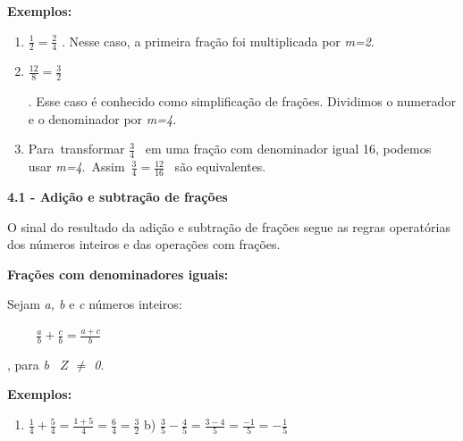 \documentclass[12pt]{article}
\renewcommand{\_}{\kern-1.5pt\textunderscore\kern-1.5pt}
\begin{document}
\textbf{Exemplos:}\par

\begin{enumerate}
	\item  \( \frac{1}{2}=\frac{2}{4} \)  . Nesse caso, a primeira fração foi multiplicada por \textit{m=2}.\par


\vspace{\baselineskip}
	\item   \( \frac{12}{8}=\frac{3}{2} \) {\fontsize{16pt}{19.2pt}\selectfont  . Esse caso é conhecido como simplificação de frações. Dividimos o numerador e o denominador por \textit{m=4.} \par}\par


\vspace{\baselineskip}
\setlength{\parskip}{8.04pt}
\setlength{\parskip}{0.0pt}
	\item Para\ transformar   \( \frac{3}{4} \) \  em uma fração com denominador igual 16, podemos usar \textit{m=4}.\ Assim\    \( \frac{3}{4}=\frac{12}{16} \) \  são equivalentes.
\end{enumerate}\par


\vspace{\baselineskip}
\textbf{4.1 - Adição e subtração de frações }\par

\tab O sinal do resultado da adição e subtração de frações segue as regras operatórias dos números inteiros e das operações com frações.\par

\tab 
\vspace{\baselineskip}\tab \textbf{Frações com denominadores iguais:}\par

Sejam \textit{a, b} e \textit{c} números inteiros: \par

\textbf{\tab \ \ \ \   \( \frac{a}{b}+\frac{c}{b}=\frac{a+c}{b} \) \tab }{\fontsize{16pt}{19.2pt}\selectfont \tab , para \textit{b \   \( Z \)  $ \neq $  0}.\par}\par

\textbf{Exemplos: }\par

\begin{enumerate}
	\item  \( \frac{1}{4}+\frac{5}{4}=\frac{1+5}{4}=\frac{6}{4}=\frac{3}{2} \) \tab \tab b)  \( \frac{3}{5}-\frac{4}{5}=\frac{3-4}{5}=\frac{-1}{5}=-\frac{1}{5} \) \tab 
\end{enumerate}\par
\end{document}
